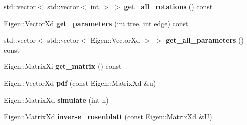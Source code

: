 \begin{DoxyCompactItemize}
\item 
std\+::vector$<$ std\+::vector$<$ int $>$ $>$ {\bfseries get\+\_\+all\+\_\+rotations} () const \hypertarget{classvinecopulib_1_1_vinecop_a33715bd84261180ea637275f9d8b881b}{}\label{classvinecopulib_1_1_vinecop_a33715bd84261180ea637275f9d8b881b}

\item 
Eigen\+::\+Vector\+Xd {\bfseries get\+\_\+parameters} (int tree, int edge) const \hypertarget{classvinecopulib_1_1_vinecop_a2ddcc85cb5f2c05edd9093fe863812f6}{}\label{classvinecopulib_1_1_vinecop_a2ddcc85cb5f2c05edd9093fe863812f6}

\item 
std\+::vector$<$ std\+::vector$<$ Eigen\+::\+Vector\+Xd $>$ $>$ {\bfseries get\+\_\+all\+\_\+parameters} () const \hypertarget{classvinecopulib_1_1_vinecop_ae1f173e30760405a445ec7d2ad8d41ea}{}\label{classvinecopulib_1_1_vinecop_ae1f173e30760405a445ec7d2ad8d41ea}

\item 
Eigen\+::\+Matrix\+Xi {\bfseries get\+\_\+matrix} () const \hypertarget{classvinecopulib_1_1_vinecop_aaac38f862f3b8ffd68ca04564fd0cf06}{}\label{classvinecopulib_1_1_vinecop_aaac38f862f3b8ffd68ca04564fd0cf06}

\item 
Eigen\+::\+Vector\+Xd {\bfseries pdf} (const Eigen\+::\+Matrix\+Xd \&u)\hypertarget{classvinecopulib_1_1_vinecop_adf3760b8dd2b6d3a9cae5426188d4489}{}\label{classvinecopulib_1_1_vinecop_adf3760b8dd2b6d3a9cae5426188d4489}

\item 
Eigen\+::\+Matrix\+Xd {\bfseries simulate} (int n)\hypertarget{classvinecopulib_1_1_vinecop_aa675aac119538648d60368a3572d1b5c}{}\label{classvinecopulib_1_1_vinecop_aa675aac119538648d60368a3572d1b5c}

\item 
Eigen\+::\+Matrix\+Xd {\bfseries inverse\+\_\+rosenblatt} (const Eigen\+::\+Matrix\+Xd \&U)\hypertarget{classvinecopulib_1_1_vinecop_a3d8819be948be348b6b3f30495b364ff}{}\label{classvinecopulib_1_1_vinecop_a3d8819be948be348b6b3f30495b364ff}

\end{DoxyCompactItemize}
